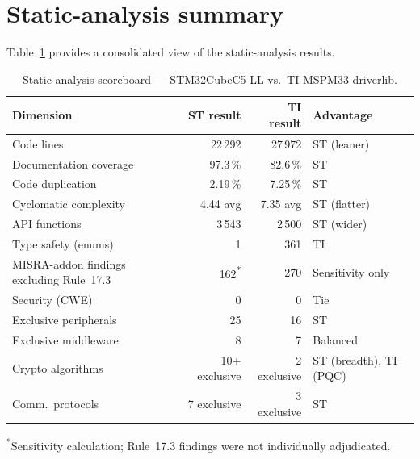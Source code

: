 \section{Static-analysis summary}
\label{sec:ti-static-summary}

Table~\ref{tab:ti-summary-scoreboard} provides a consolidated view of the static-analysis
results.

\begin{table}[H]
\centering
\caption{Static-analysis scoreboard --- STM32CubeC5 LL vs.\ TI MSPM33 driverlib.}
\label{tab:ti-summary-scoreboard}
\small
\begin{tabularx}{\textwidth}{@{}>{\raggedright\arraybackslash}X r r >{\raggedright\arraybackslash}p{3.2cm}@{}}
\toprule
\textbf{Dimension} & \textbf{ST result} & \textbf{TI result} & \textbf{Advantage} \\
\midrule
Code lines            & 22\,292          & 27\,972          & ST (leaner) \\
Documentation coverage & 97.3\,\%        & 82.6\,\%         & ST \\
Code duplication       & 2.19\,\%        & 7.25\,\%         & ST \\
Cyclomatic complexity  & 4.44 avg        & 7.35 avg         & ST (flatter) \\
API functions          & 3\,543          & 2\,500           & ST (wider) \\
Type safety (enums)    & 1               & 361              & TI \\
MISRA-addon findings excluding Rule~17.3 & 162\textsuperscript{*} & 270 & Sensitivity only \\
Security (CWE)         & 0               & 0                & Tie \\
Exclusive peripherals  & 25              & 16               & ST \\
Exclusive middleware   & 8               & 7                & Balanced \\
Crypto algorithms      & 10+ exclusive   & 2 exclusive      & ST (breadth), TI (PQC) \\
Comm.\ protocols       & 7 exclusive     & 3 exclusive      & ST \\
\bottomrule
\end{tabularx}
\par\smallskip
{\footnotesize \textsuperscript{*}Sensitivity calculation; Rule~17.3 findings were not individually adjudicated.}
\end{table}

